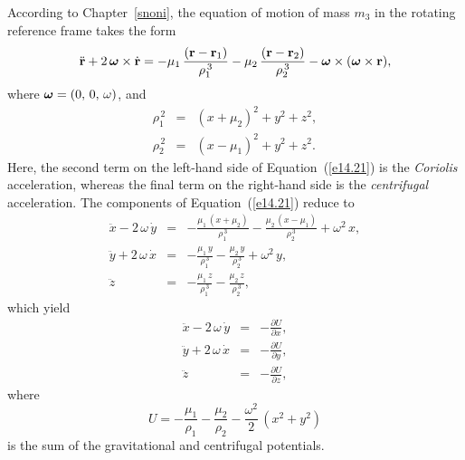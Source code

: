 According to Chapter~\ref{snoni}, the equation of motion of mass $m_3$ in the rotating
reference frame takes the form
\begin{equation}\label{e14.21}
\ddot{\bf r} + 2\,\mbox{\boldmath$\omega$}\times \dot{\bf r}= - \mu_1\,\frac{({\bf r}-{\bf r}_1)}{\rho_1^{\,3}} - 
\mu_2\,\frac{({\bf r}-{\bf r}_2)}{\rho_2^{\,3}} - \mbox{\boldmath$\omega$}\times(\mbox{\boldmath$\omega$}\times {\bf r}),
\end{equation}
where $\mbox{\boldmath$\omega$} = (0,\,0,\,\omega)$, and
\begin{eqnarray}
\rho_1^{\,2} &=& (x+\mu_2)^2+y^2 + z^2,\\[0.5ex]
\rho_2^{\,2} &=& (x-\mu_1)^2+y^2 + z^2.
\end{eqnarray}
Here, the second term on the left-hand side of Equation~(\ref{e14.21}) is the {\em Coriolis}\/ acceleration,
whereas the final term on the right-hand side is the {\em centrifugal}\/ acceleration. The components of Equation~(\ref{e14.21})
reduce to
\begin{eqnarray}
\ddot{x} - 2\,\omega\,\dot{y} &=& - \frac{\mu_1\,(x+\mu_2)}{\rho_1^{\,3}}- \frac{\mu_2\,(x-\mu_1)}{\rho_2^{\,3}}
+ \omega^2\,x,\\[0.5ex]
\ddot{y} + 2\,\omega\,\dot{x} &=& - \frac{\mu_1\,y}{\rho_1^{\,3}}- \frac{\mu_2\,y}{\rho_2^{\,3}}
+ \omega^2\,y,\\[0.5ex]
\ddot{z}  &=& - \frac{\mu_1\,z}{\rho_1^{\,3}}- \frac{\mu_2\,z}{\rho_2^{\,3}},
\end{eqnarray}
which yield
\begin{eqnarray}\label{e14.27}
\ddot{x} - 2\,\omega\,\dot{y} &=& -\frac{\partial U}{\partial x},\\[0.5ex]
\ddot{y} + 2\,\omega\,\dot{x} &=& -\frac{\partial U}{\partial y},\label{e14.28}\\[0.5ex]
\ddot{z}  &=& -\frac{\partial U}{\partial z},\label{e14.29}
\end{eqnarray}
where
\begin{equation}\label{e14.30}
U = - \frac{\mu_1}{\rho_1} - \frac{\mu_2}{\rho_2} - \frac{\omega^2}{2}\,(x^2+y^2)
\end{equation}
is the sum of the gravitational and centrifugal potentials.

